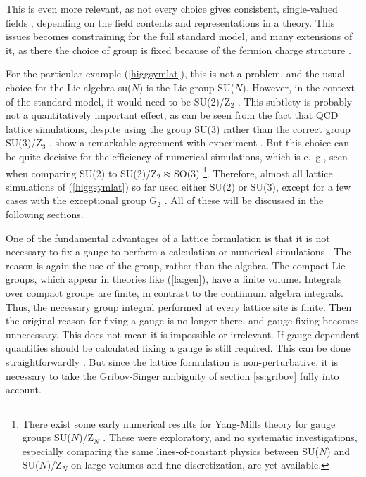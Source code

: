 \documentclass[final,12pt,3p,longtitle]{elsarticle}
\newcommand*{\pref}[1]{(\ref{#1})}
\newcommand*{\1}{1\!\!\!\bot}
\begin{document}
This is even more relevant, as not every choice gives consistent, single-valued fields \cite{O'Raifeartaigh:1986vq}, depending on the field contents and representations in a theory. This issues becomes constraining for the full standard model, and many extensions of it, as there the choice of group is fixed because of the fermion charge structure \cite{O'Raifeartaigh:1986vq}.

For the particular example \pref{higgsymlat}, this is not a problem, and the usual choice for the Lie algebra su($N$) is the Lie group SU($N$). However, in the context of the standard model, it would need to be SU(2)/Z$_2$ \cite{O'Raifeartaigh:1986vq}. This subtlety is probably not a quantitatively important effect, as can be seen from the fact that QCD lattice simulations, despite using the group SU(3) rather than the correct group SU(3)/Z$_3$ \cite{O'Raifeartaigh:1986vq}, show a remarkable agreement with experiment \cite{Gattringer:2010zz,DeGrand:2006zz}. But this choice can be quite decisive for the efficiency of numerical simulations, which is e.\ g., seen when comparing SU(2) to SU(2)/Z$_2\approx$SO(3) \cite{deForcrand:2002vs,Friedberg:1995cq,Burgio:2006xj,Burgio:2006dc}\footnote{There exist some early numerical results for Yang-Mills theory for gauge groups SU($N$)/Z$_N$ \cite{Greensite:1981hw,Halliday:1981te,Creutz:1982ga,Drouffe:1982fe}. These were exploratory, and no systematic investigations, especially comparing the same lines-of-constant physics between SU($N$) and SU($N$)/Z$_N$ on large volumes and fine discretization, are yet available.}. Therefore, almost all lattice simulations of \pref{higgsymlat} so far used either SU(2) or SU(3), except for a few cases with the exceptional group G$_2$ \cite{Wellegehausen:2011sc}. All of these will be discussed in the following sections.

One of the fundamental advantages of a lattice formulation is that it is not necessary to fix a gauge to perform a calculation or numerical simulations \cite{Montvay:1994cy,Gattringer:2010zz,DeGrand:2006zz}. The reason is again the use of the group, rather than the algebra. The compact Lie groups, which appear in theories like \pref{la:gen}, have a finite volume. Integrals over compact groups are finite, in contrast to the continuum algebra integrals. Thus, the necessary group integral performed at every lattice site is finite. Then the original reason for fixing a gauge is no longer there, and gauge fixing becomes unnecessary. This does not mean it is impossible or irrelevant. If gauge-dependent quantities should be calculated fixing a gauge is still required. This can be done straightforwardly \cite{Maas:2011se}. But since the lattice formulation is non-perturbative, it is necessary to take the Gribov-Singer ambiguity of section \ref{ss:gribov} fully into account.
\end{document}

